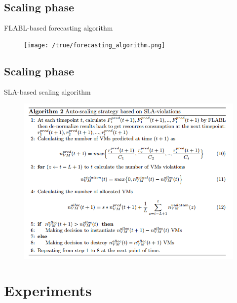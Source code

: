 \documentclass{beamer}
\begin{document}
\subsection*{Scaling phase}
\begin{frame}{FLABL-based forecasting algorithm}
	\begin{figure}
		\texttt{[image: /true/forecasting\_algorithm.png]} %
		\label{fig:ga}			
	\end{figure}
\end{frame}

	
\subsection*{Scaling phase}
\begin{frame}{SLA-based scaling algorithm}
	\begin{figure}
		\includegraphics[width=0.85 \textwidth]{true/scaling_algorithm.png} %
		\label{fig:scaling_algorithm}			
	\end{figure}
\end{frame}





\section{Experiments}
\end{document}
